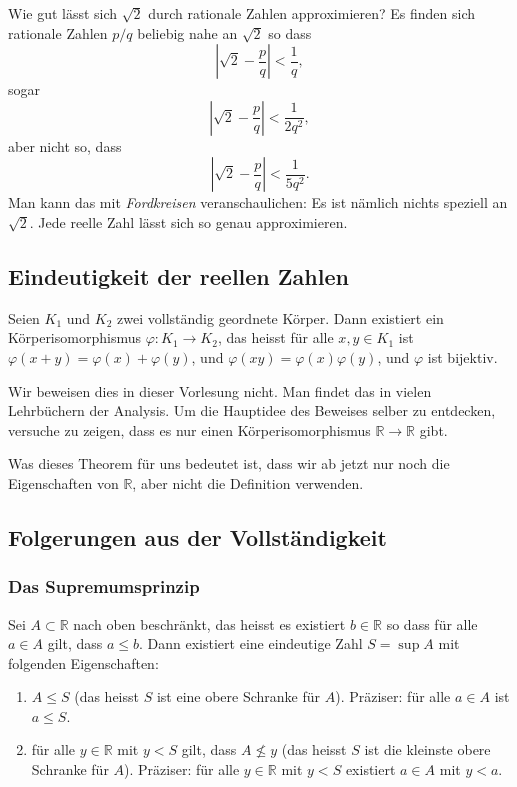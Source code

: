 \documentclass[../main.tex]{subfiles}
\begin{document}
\begin{einschub}
  Wie gut lässt sich $\sqrt 2$ durch rationale Zahlen
  approximieren? Es finden sich rationale Zahlen $p/q$ beliebig
  nahe an $\sqrt 2$ so dass
  \[
    \left\vert \sqrt 2 - \frac{p}{q} \right\vert < \frac{1}{q},
  \]
  sogar
  \[
    \left\vert \sqrt 2 - \frac{p}{q} \right\vert < \frac{1}{2q^2},
  \]
  aber nicht so, dass
  \[
    \left\vert \sqrt 2 - \frac{p}{q} \right\vert < \frac{1}{5q^2}.
  \]
  Man kann das mit \emph{Fordkreisen} veranschaulichen:
  Es ist nämlich nichts speziell an $\sqrt 2$. Jede reelle Zahl
  lässt sich so genau approximieren.
\end{einschub}

\subsection*{Eindeutigkeit der reellen Zahlen}
\begin{theorem}[Dedekind]
  Seien $K_1$ und $K_2$ zwei vollständig geordnete Körper.
  Dann existiert ein Körperisomorphismus
  $\varphi\colon K_1 \to K_2$, das heisst
	   für alle $x, y \in K_1$ ist $\varphi(x+y)
		  = \varphi(x) + \varphi(y)$,
		  und $\varphi(xy) = \varphi(x)\varphi(y)$,
	und $\varphi$ ist bijektiv.
\end{theorem}
Wir beweisen dies in dieser Vorlesung nicht.
Man findet das in vielen Lehrbüchern der Analysis.
Um die Hauptidee des Beweises selber zu entdecken,
versuche zu zeigen, dass es nur einen Körperisomorphismus
$\mathbb{R} \to \mathbb{R}$ gibt.

Was dieses Theorem für uns bedeutet ist, dass wir ab jetzt
nur noch die Eigenschaften von $\mathbb{R}$, aber nicht
die Definition verwenden.

\subsection*{Folgerungen aus der Vollständigkeit}
\subsubsection*{Das Supremumsprinzip}
\begin{supremum}
Sei $A \subset \mathbb{R}$ nach oben beschränkt,
das heisst es existiert $b \in \mathbb{R}$ so dass
für alle $a \in A$ gilt, dass $a \leq b$.
Dann existiert eine eindeutige Zahl $S = \sup A$
mit folgenden Eigenschaften:
\begin{enumerate}[\normalfont(i)]
	\item $A \leq S$ (das heisst $S$ ist eine obere Schranke
		für $A$). Präziser: für alle $a \in A$
		ist $a \leq S$.
  \item für alle $y \in \mathbb{R}$ mit $y < S$ gilt,
	  dass $A \not \leq y$ (das heisst $S$ ist die kleinste
	  obere Schranke für $A$). Präziser: für alle $y \in \mathbb{R}$
	  mit $y < S$ existiert $a \in A$ mit $y < a$.
\end{enumerate}
\end{supremum}
\end{document}
